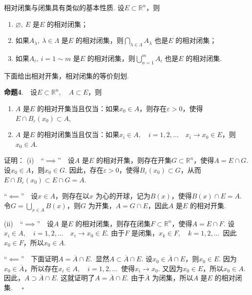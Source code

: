 \documentclass{article}
\begin{document}
\vspace{10pt}

相对闭集与闭集具有类似的基本性质. 设\(E \subset \mathbb{R}^n\)，则
\begin{enumerate}
    \item \(\varnothing ,\ E\) 是\(E\) 的相对闭集；
    \item 如果\(A_{\lambda },\ \lambda \in \Lambda \) 是\(E\) 的相对闭集，则\(\bigcap_{\lambda \in \Lambda } A_{\lambda } \) 也是\(E\) 的相对闭集；
    \item 如果\(A_i,\ i = 1 \sim m \) 是\(E\) 的相对闭集，则\(\bigcup_{n=1}^{m} A_i \) 也是\(E\) 的相对闭集.
\end{enumerate}

\newpage

下面给出相对开集，相对闭集的等价刻划.

\vspace{10pt}

\textbf{命题4}.\ \ 设\(E \subset \mathbb{R}^n,\quad A \subset E\)，则
\begin{enumerate}
    \item \(A\) 是\(E\) 的相对开集当且仅当：如果\(x_0 \in A\)，则存在\(\varepsilon > 0\)，使得\(E \cap B_{\varepsilon }(x_0)\subset A\),
    \item \(A\) 是\(E\) 的相对闭集当且仅当：如果\(x_i \in A,\quad i = 1,2,\dots \quad x_i \to x_0 \in E\)，则\(x_0 \in A\).
\end{enumerate}

\vspace{10pt}

证明：\newline
(i)\ \ “\( \implies \)”\ \ 设\(A\) 是\(E\) 的相对开集，则存在开集\(G \subset \mathbb{R}^n\)，使得\(A = E \cap G\). 设\(x_0 \in A\)，则\(x_0 \in G\). 因此，存在\(\varepsilon > 0\)，使得\(B_{\varepsilon }(x_0)\subset G\)，从而\(E \cap B_{\varepsilon }(x_0)\subset E \cap G = A\).

“\( \impliedby \)”\ \ 设\(x \in A\)，则存在以\(x\) 为心的开球，记为\(B(x)\)，使得\(B(x) \cap E = A\). 令\(G = \bigcup_{x \in A} B(x) \)，则\(G\) 为开集，\(A = G \cap E\)，因此\(A\) 是\(E\) 的相对开集.

(ii)\ \ “\( \implies \)”\ \ 设\(A\) 是\(E\) 的相对闭集，则存在闭集\(F \subset \mathbb{R}^n\)，使得\(A = E \cap F\). 设\(x_i \in A,\quad i = 1,2,\dots \quad x_i \to x_0 \in E\). 由于\(F\) 是闭集，\(x_k \in F,\quad k = 1,2,\dots \)\ 因此\(x_0 \in F\)，所以\(x_0 \in A\).

“\( \impliedby \)”\ \ 下面证明\(A = \overline{A}\cap E\).\ 显然\(A \subset \overline{A}\cap E\). 设\(x_0 \in \overline{A}\cap E\)，则\(x_0 \in E\). 因为\(x_0 \in \overline{A}\)，所以存在\(x_i \in A,\quad i = 1,2,\dots \)\ 使得\(x_i \to x_0\). 又因为\(x_0 \in E\)，所以\(x_0 \in A\). 因此，\(A \supset \overline{A}\cap E\). 这就证明了\(A = \overline{A}\cap E\). 由于\(\overline{A}\) 为闭集，所以\(A\) 是\(E\) 的相对闭集. \(\quad \square\)
\end{document}
